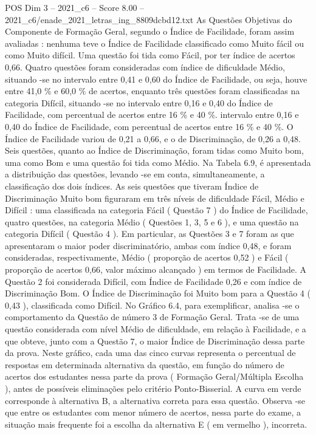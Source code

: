 \begin{textsample}{POS Dim 3 – 2021\_c6 – Score 8.00 – 2021\_c6/enade\_2021\_letras\_ing\_8809dcbd12.txt}
As Questões Objetivas do Componente de Formação Geral, segundo o Índice de Facilidade, foram assim avaliadas : nenhuma teve o Índice de Facilidade classificado como Muito fácil ou como Muito difícil.
Uma questão foi tida como Fácil, por ter índice de acertos 0,66.
Quatro questões foram consideradas com índice de dificuldade Médio, situando -se no intervalo entre 0,41 e 0,60 do Índice de Facilidade, ou seja, houve entre 41,0 \% e 60,0 \% de acertos, enquanto três questões foram classificadas na categoria Difícil, situando -se no intervalo entre 0,16 e 0,40 do Índice de Facilidade, com percentual de acertos entre 16 \% e 40 \%. intervalo entre 0,16 e 0,40 do Índice de Facilidade, com percentual de acertos entre 16 \% e 40 \%.
O Índice de Facilidade variou de 0,21 a 0,66, e o de Discriminação, de 0,26 a 0,48.
Seis questões, quanto ao Índice de Discriminação, foram tidas como Muito bom, uma como Bom e uma questão foi tida como Médio.
Na Tabela 6.9, é apresentada a distribuição das questões, levando -se em conta, simultaneamente, a classificação dos dois índices.
As seis questões que tiveram Índice de Discriminação Muito bom figuraram em três níveis de dificuldade Fácil, Médio e Difícil : uma classificada na categoria Fácil ( Questão 7 ) do Índice de Facilidade, quatro questões, na categoria Médio ( Questões 1, 3, 5 e 6 ), e uma questão na categoria Difícil ( Questão 4 ).
Em particular, as Questões 3 e 7 foram as que apresentaram o maior poder discriminatório, ambas com índice 0,48, e foram consideradas, respectivamente, Médio ( proporção de acertos 0,52 ) e Fácil ( proporção de acertos 0,66, valor máximo alcançado ) em termos de Facilidade.
A Questão 2 foi considerada Difícil, com Índice de Facilidade 0,26 e com índice de Discriminação Bom.
O Índice de Discriminação foi Muito bom para a Questão 4 ( 0,43 ), classificada como Difícil.
No Gráfico 6.4, para exemplificar, analisa -se o comportamento da Questão de número 3 de Formação Geral.
Trata -se de uma questão considerada com nível Médio de dificuldade, em relação à Facilidade, e a que obteve, junto com a Questão 7, o maior Índice de Discriminação dessa parte da prova.
Neste gráfico, cada uma das cinco curvas representa o percentual de respostas em determinada alternativa da questão, em função do número de acertos dos estudantes nessa parte da prova ( Formação Geral/Múltipla Escolha ), antes de possíveis eliminações pelo critério Ponto-Bisserial.
A curva em verde corresponde à alternativa B, a alternativa correta para essa questão.
Observa -se que entre os estudantes com menor número de acertos, nessa parte do exame, a situação mais frequente foi a escolha da alternativa E ( em vermelho ), incorreta.

\end{textsample}
